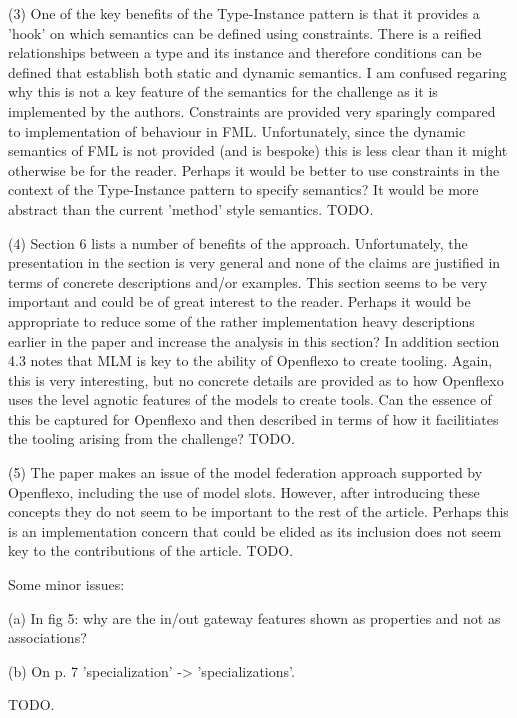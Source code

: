 \documentclass[10pt]{article}
\begin{document}
\begin{response}{(3) One of the key benefits of the Type-Instance pattern is that it provides a 'hook' on which semantics can be defined using constraints. There is a reified relationships between a type and its instance and therefore conditions can be defined that establish both static and dynamic semantics. I am confused regaring why this is not a key feature of the semantics for the challenge as it is implemented by the authors. Constraints are provided very sparingly compared to implementation of behaviour in FML. Unfortunately, since the dynamic semantics of FML is not provided (and is bespoke) this is less clear than it might otherwise be for the reader. Perhaps it would be better to use constraints in the context of the Type-Instance pattern to specify semantics? It would be more abstract than the current 'method' style semantics.} 
TODO.
\end{response}

\begin{response}{(4) Section 6 lists a number of benefits of the approach. Unfortunately, the presentation in the section is very general and none of the claims are justified in terms of concrete descriptions and/or examples. This section seems to be very important and could be of great interest to the reader. Perhaps it would be appropriate to reduce some of the rather implementation heavy descriptions earlier in the paper and increase the analysis in this section? In addition section 4.3 notes that MLM is key to the ability of Openflexo to create tooling. Again, this is very interesting, but no concrete details are provided as to how Openflexo uses the level agnotic features of the models to create tools. Can the essence of this be captured for Openflexo and then described in terms of how it facilitiates the tooling arising from the challenge?} 
TODO.
\end{response}

\begin{response}{(5) The paper makes an issue of the model federation approach supported by Openflexo, including the use of model slots. However, after introducing these concepts they do not seem to be important to the rest of the article. Perhaps this is an implementation concern that could be elided as its inclusion does not seem key to the contributions of the article. } 
TODO.
\end{response}

\begin{response}{Some minor issues:

(a) In fig 5: why are the in/out gateway features shown as properties and not as associations?

(b) On p. 7 'specialization' -> 'specializations'.} 
TODO.
\end{response}
\end{document}
